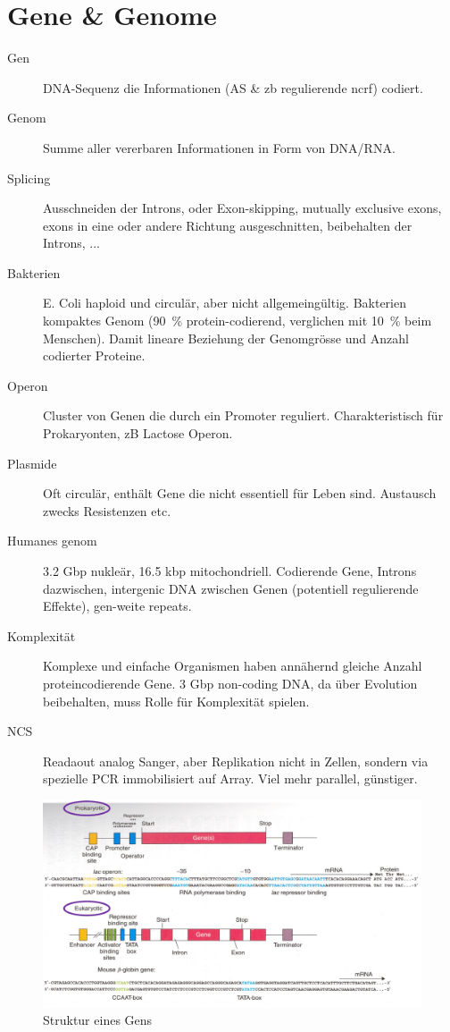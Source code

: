 \documentclass[a4paper,twocolumn,english,fontsize=7,DIV=16]{scrartcl}
\begin{document}
\section{Gene \& Genome}

\begin{description}
	\item[Gen] DNA-Sequenz die Informationen (AS \& zb regulierende ncrf)
		codiert.
	\item[Genom] Summe aller vererbaren Informationen in Form von DNA/RNA.
	\item[Splicing] Ausschneiden der Introns, oder Exon-skipping, mutually
		exclusive exons, exons in eine oder andere Richtung
		ausgeschnitten, beibehalten der Introns, ...
	\item[Bakterien] E. Coli haploid und circulär, aber nicht
		allgemeingültig. Bakterien kompaktes Genom (\SI{90}{\percent}
		protein-codierend, verglichen mit \SI{10}{\percent} beim
		Menschen). Damit lineare Beziehung der Genomgrösse und Anzahl
		codierter Proteine.
	\item[Operon] Cluster von Genen die durch ein Promoter reguliert.
		Charakteristisch für Prokaryonten, zB Lactose Operon.
	\item[Plasmide] Oft circulär, enthält Gene die nicht essentiell für
		Leben sind. Austausch zwecks Resistenzen etc.
	\item[Humanes genom] 3.2 Gbp nukleär, 16.5 kbp mitochondriell.
		Codierende Gene, Introns dazwischen, intergenic DNA zwischen
		Genen (potentiell regulierende Effekte), gen-weite repeats.
	\item[Komplexität] Komplexe und einfache Organismen haben annähernd
		gleiche Anzahl proteincodierende Gene. 3 Gbp non-coding DNA, da
		über Evolution beibehalten, muss Rolle für Komplexität spielen.
	\item[NCS] Readaout analog Sanger, aber Replikation nicht in Zellen,
		sondern via spezielle PCR immobilisiert auf Array. Viel mehr
		parallel, günstiger.
\end{description}

\begin{figure}
	\centering
	\includegraphics[width=\linewidth]{img/gen_aufbau.png}
	\caption{Struktur eines Gens}
\end{figure}
\end{document}
